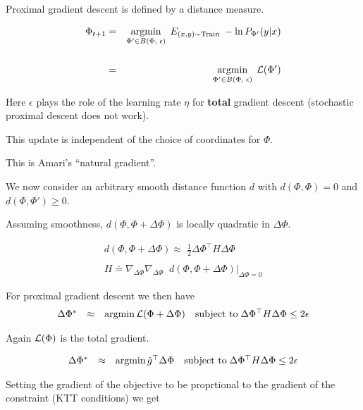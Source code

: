 {

Proximal gradient descent is defined by a distance measure.

\vfill
\begin{eqnarray*}
\Phi_{t+1} & = & \operatorname*{argmin}_{\Phi' \in B(\Phi,\;\epsilon)}\;E_{(x,y) \sim \mathrm{Train}}\;- \ln P_{\Phi'}(y|x) \\
\\
& = & \operatorname*{argmin}_{\Phi' \in B(\Phi,\;\epsilon)}\;{\cal L}(\Phi')
\end{eqnarray*}

\vfill
Here $\epsilon$ plays the role of the learning rate $\eta$ for {\bf total} gradient descent (stochastic proximal descent does not work).

\vfill
This update is independent of the choice of coordinates for $\Phi$.

\vfill
This is Amari's ``natural gradient''.


We now consider an arbitrary smooth distance function $d$ with $d(\Phi,\Phi) = 0$ and $d(\Phi,\Phi') \geq 0$.

\vfill
\centerline{Assuming smoothness, $d(\Phi, \Phi+\Delta \Phi)$ is locally quadratic in $\Delta \Phi$.}

\begin{eqnarray*}
d(\Phi,\Phi + \Delta \Phi) \approx \;\frac{1}{2} \Delta \Phi^\top H \Delta \Phi \\
\\
H \doteq \nabla_{\Delta \Phi} \nabla_{\Delta \Phi} \;\;d(\Phi,\Phi+\Delta \Phi)|_{\Delta \Phi = 0}
\end{eqnarray*}

\vfill
For proximal gradient descent we then have
$$\begin{array}{rcll}
\Delta \Phi^* & \approx & \operatorname*{argmin} {\cal L}(\Phi + \Delta \Phi) &\mbox{subject to}\; \Delta \Phi^\top H \Delta \Phi \leq 2\epsilon
\end{array}$$

Again ${\cal L}(\Phi)$ is the total gradient.


$$\begin{array}{rcll}
\Delta \Phi^* & \approx & \operatorname*{argmin} \hat{g}^\top \Delta \Phi &\mbox{subject to}\; \Delta \Phi^\top H \Delta \Phi \leq 2\epsilon
\end{array}$$

\vfill
Setting the gradient of the objective to be proprtional to the gradient of the constraint (KTT conditions) we get

}
